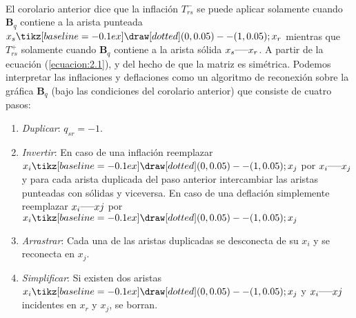 \paragraph{}
El corolario anterior dice que la inflación $T_{rs}^{-}$ se puede aplicar solamente cuando $\textbf{B}_{q}$ contiene a la arista punteada $x_{s} \tikz[baseline=-0.1ex]\draw [dotted] (0,0.05) -- (1,0.05); x_{r}$ mientras que $T_{rs}^{+}$ solamente cuando $\textbf{B}_{q}$ contiene a la arista sólida $x_{s}  \rule[1mm]{5mm}{0.1mm} x_{r}$. A partir de la ecuación (\ref{ecuacion:2.1}), y del hecho de que la matriz es simétrica. Podemos interpretar las inflaciones y deflaciones como un algoritmo de reconexión sobre la gráfica $\textbf{B}_{q}$ (bajo las condiciones del corolario anterior) que consiste de cuatro pasos:
\begin{enumerate}
    \item \textit{Duplicar}: $q_{sr} = -1$.
    \item \textit{Invertir}: En caso de una inflación reemplazar $x_{i} \tikz[baseline=-0.1ex]\draw [dotted] (0,0.05) -- (1,0.05); x_{j}$ por $x_{i} \rule[1mm]{5mm}{0.1mm} x_{j}$ y para cada arista duplicada del paso anterior intercambiar las aristas punteadas con sólidas y viceversa. En caso de una deflación simplemente reemplazar $x_{i} \rule[1mm]{5mm}{0.1mm} x{j}$ por $x_{i} \tikz[baseline=-0.1ex]\draw [dotted] (0,0.05) -- (1,0.05); x_{j}$
    \item \textit{Arrastrar}: Cada una de las aristas duplicadas se desconecta de su $x_{i}$ y se reconecta en $x_{j}$.
    \item \textit{Simplificar}: Si existen dos aristas $x_{i} \tikz[baseline=-0.1ex]\draw [dotted] (0,0.05) -- (1,0.05); x_{j}$ y $x_{i} \rule[1mm]{5mm}{0.1mm} x{j}$ incidentes en $x_{r}$ y $x_{j}$,  se borran.
\end{enumerate}
